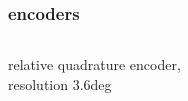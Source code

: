 \documentclass{beamer}
\begin{document}
\begin{frame}

  \frametitle{\bf encoders}

  \begin{columns}

    \begin{column}{0.5\textwidth}
      relative quadrature encoder, \\ resolution 3.6deg \\

\end{column}
\end{columns}
\end{frame}
\end{document}
